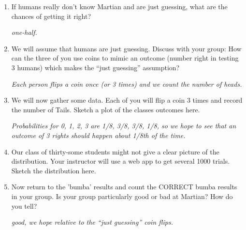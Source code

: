 \begin{enumerate}
\item  If humans really don't know Martian and are just guessing, what
  are the chances of getting it right? 
\begin{students}
  \vspace{1cm}
\end{students}    
\begin{key}
   {\it one-half.}
\end{key}
 
  \item \label{flip3} We will assume that humans are just guessing. Discuss with
    your group: How can the three of you use  coins to mimic an outcome (number
    right in testing 3 humans) which makes the ``just guessing'' assumption? 
\begin{students}
  \vspace{1.5cm}
\end{students}    
\begin{key}
   {\it Each person flips a coin once (or 3 times) and we count the
     number of heads.}
\end{key}
 
\item We will now gather some data.  Each of you will flip a coin 3
  times and record the number of Tails.  Sketch a plot of the classes
  outcomes here. 
\begin{students}
  \vspace{3cm}
\end{students}    
\begin{key}
   {\it Probabilities for 0, 1, 2, 3 are 1/8, 3/8, 3/8, 1/8, so we
     hope to see that an outcome of 3 rights should happen about 1/8th
   of the time.}
\end{key}

\item Our class of thirty-some students might not give a clear picture
  of the distribution.  Your instructor will use a web app to get
  several 1000 trials.  Sketch the distribution here. 
\begin{students}
  \vspace{3cm}
\end{students}   

\item Now return to the 'bumba' results and count the CORRECT bumba
  results in your group.  Is your group particularly good or bad at
  Martian? How do you tell?
\begin{students}
  \vspace{1cm}
\end{students}    
\begin{key}
   {\it good, we hope relative to the ``just guessing'' coin flips.}
\end{key}



\end{enumerate}
